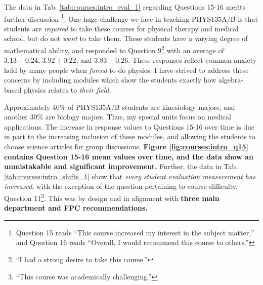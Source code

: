\documentclass[../../main.tex]{subfiles}
\begin{document}
The data in Tab. \ref{tab:courses:intro_eval_1} regarding Questions 15-16 merits further discussion \footnote{Question 15 reads ``This course increased my interest in the subject matter,'' and Question 16 reads ``Overall, I would recommend this course to others.''}.  One huge challenge we face in teaching PHYS135A/B is that students are \textit{required} to take these courses for physical therapy and medical school, but do not \textit{want} to take them.  These students have a varying degree of mathematical ability, and responded to Question 9\footnote{``I had a strong desire to take this course.''} with an average of $3.13 \pm 0.24$, $3.92 \pm 0.22$, and $3.83 \pm 0.26$.  These responses reflect common anxiety held by many people when \textit{forced} to do physics.  I have strived to address these concerns by including modules which show the students exactly how algebra-based physics relates to \textit{their field.} \\ \hspace{0.1cm}

Approximately 40\% of PHYS135A/B students are kinesiology majors, and another 30\% are biology majors.  Thus, my special units focus on medical applications.  The increase in response values to Questions 15-16 over time is due in part to the increasing inclusion of these modules, and allowing the students to choose science articles for group discussions.  \textbf{Figure  \ref{fig:courses:intro_q15} contains Question 15-16 mean values over time, and the data show an unmistakable and significant improvement.}  Further, the data in Tab. \ref{tab:courses:intro_shifts_1} show that \textit{every student evaluation measurement has increased}, with the exception of the question pertaining to course difficulty, Question 11\footnote{``This course was academically challenging.''}.  This was by design and in alignment with \textbf{three main department and FPC recommendations.} \\ \hspace{0.1cm}
\end{document}
